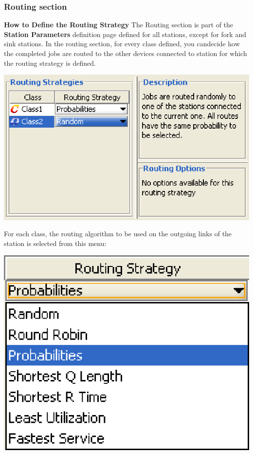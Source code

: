 \subsubsection{Routing section}
\label{sec:RoutingSection}
\textbf{How to Define the Routing Strategy}
The Routing section is part of the \textbf{Station Parameters} definition page defined for all stations, except for fork and sink stations.
In the routing section, for every class defined, you candecide how the completed jobs are routed to the other devices connected to station for which the routing strategy is defined. 
\begin{center}
\includegraphics[scale=.5]{img/jsim/routing1.eps}
\end{center}
For each class, the routing algorithm to be used on the outgoing links of the station is selected from this menu:\\
\begin{center}
\includegraphics[scale=.5]{img/jsim/strategy.eps} 
\end{center}
